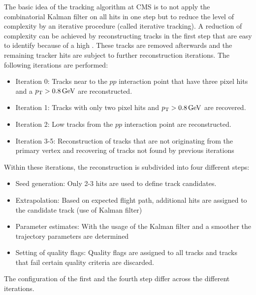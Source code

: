The basic idea of the tracking algorithm at CMS is to not apply the combinatorial Kalman filter on all hits in one step but to reduce the level of complexity by an iterative procedure (called iterative tracking).
A reduction of complexity can be achieved by reconstructing tracks in the first step that are easy to identify because of \eg a high \pt. 
These tracks are removed afterwards and the remaining tracker hits are subject to further reconstruction iterations.
The following iterations are performed:
\begin{itemize}
\item Iteration 0: Tracks near to the $pp$ interaction point that have three pixel hits and a $p_{\text{T}}>0.8\,\text{Ge}\kern-0.06667em\text{V}$ are reconstructed.
\item Iteration 1: Tracks with only two pixel hits and $p_{\text{T}}>0.8\,\text{Ge}\kern-0.06667em\text{V}$ are recovered.
\item Iteration 2: Low \pt tracks from the $pp$ interaction point are reconstructed.
\item Iteration 3-5: Reconstruction of tracks that are not originating from the primary vertex and recovering of tracks not found by previous iterations
\end{itemize}
Within these iterations, the reconstruction is subdivided into four different steps:
\begin{itemize}
\item Seed generation: Only 2-3 hits are used to define track candidates.
\item Extrapolation: Based on expected flight path, additional hits are assigned to the candidate track (use of Kalman filter)
\item Parameter estimates: With the usage of the Kalman filter and a smoother the trajectory parameters are determined
\item Setting of quality flags: Quality flags are assigned to all tracks and tracks that fail certain quality criteria are discarded.
\end{itemize}
The configuration of the first and the fourth step differ across the different iterations.  

